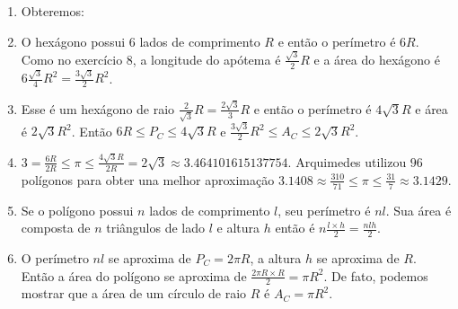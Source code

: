 \begin{enumerate}
\item Obteremos:

\begin{center}
\end{center}

\item O hexágono possui $6$ lados de comprimento $R$ e então o
  perímetro é $6R$. Como no exercício 8, 
  a longitude do apótema é $\frac{\sqrt{3}}{2} R$ e 
  a área do hexágono é
  $6 \frac{\sqrt{3}}{4} R^2 = \frac{3 \sqrt{3}}{2} R^2$.
\item Esse é um hexágono de raio
  ${\frac{2}{\sqrt{3}} R}={\frac{2\sqrt{3}}{3} R}$ e então
  o perímetro é $4 \sqrt{3} R$ e área é $2 \sqrt{3} R^2$.
  Então $6R \leq P_C \leq 4 \sqrt{3} R$ e
  $\frac{3 \sqrt{3}}{2} R^2 \leq A_C \leq 2 \sqrt{3} R^2$.
\item $3 = \frac{6R}{2R} \leq \pi \leq \frac{4 \sqrt{3} R}{2R} = 2\sqrt{3} \approx 3.464101615137754$.
  Arquimedes utilizou $96$ polígonos para obter una melhor aproximação
  $3.1408 \approx \frac{310}{71} \leq \pi \leq \frac{31}{7} \approx 3.1429$.
\item Se o polígono possui $n$ lados de comprimento $l$, seu perímetro é $nl$.
  Sua área é composta de $n$ triângulos de lado $l$ e altura $h$ então
  é $n \frac{l \times h}{2} = \frac{nlh}{2}$.
\item O perímetro $nl$ se aproxima de $P_C = 2 \pi R$, a altura $h$ se aproxima
  de $R$. Então a área do polígono se aproxima de
  $\frac{2 \pi R \times R}{2} = \pi R^2$. De fato, podemos mostrar que
  a área de um círculo de raio $R$ é $A_C = \pi R^2$.
\end{enumerate}

